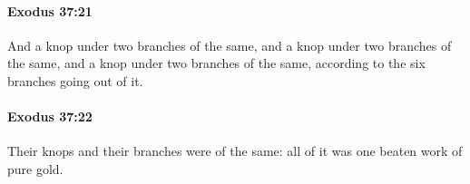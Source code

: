 		\paragraph{Exodus 37:21} %
			\label{EXODUS-37-21}

			And a knop under two branches of the same, and a knop under two branches of the same, and a knop under two branches of the same, according to the six branches going out of it.


		\paragraph{Exodus 37:22} %
			\label{EXODUS-37-22}

			Their knops and their branches were of the same: all of it was one beaten work of pure gold.


